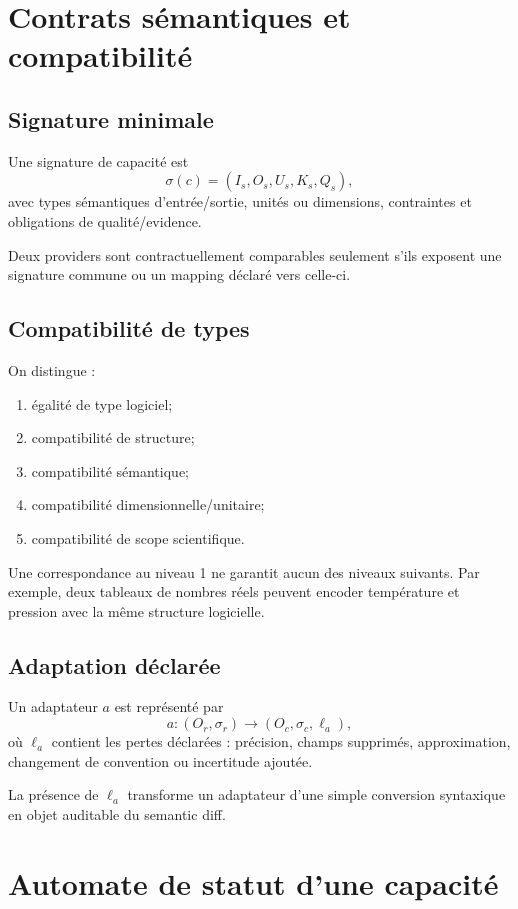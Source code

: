 \chapter{Contrats sémantiques et compatibilité}

\section{Signature minimale}

Une signature de capacité est
\[
\sigma(c)=(I_s,O_s,U_s,K_s,Q_s),
\]
avec types sémantiques d'entrée/sortie, unités ou dimensions, contraintes et obligations de qualité/evidence.

Deux providers sont contractuellement comparables seulement s'ils exposent une signature commune ou un mapping déclaré vers celle-ci.

\section{Compatibilité de types}

On distingue :
\begin{enumerate}
  \item égalité de type logiciel;
  \item compatibilité de structure;
  \item compatibilité sémantique;
  \item compatibilité dimensionnelle/unitaire;
  \item compatibilité de scope scientifique.
\end{enumerate}

Une correspondance au niveau 1 ne garantit aucun des niveaux suivants. Par exemple, deux tableaux de nombres réels peuvent encoder température et pression avec la même structure logicielle.

\section{Adaptation déclarée}

Un adaptateur $a$ est représenté par
\[
a:(O_r,\sigma_r)\to(O_c,\sigma_c,\ell_a),
\]
où $\ell_a$ contient les pertes déclarées : précision, champs supprimés, approximation, changement de convention ou incertitude ajoutée.

La présence de $\ell_a$ transforme un adaptateur d'une simple conversion syntaxique en objet auditable du semantic diff.

\chapter{Automate de statut d'une capacité}

